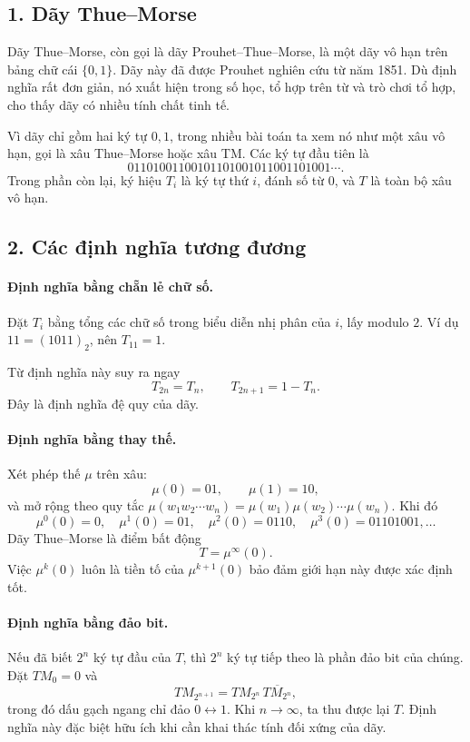 \documentclass[11pt]{article}
\begin{document}
\subsection*{1. Dãy Thue--Morse}

Dãy Thue--Morse, còn gọi là dãy Prouhet--Thue--Morse, là một dãy vô hạn trên
bảng chữ cái \(\{0,1\}\). Dãy này đã được Prouhet nghiên cứu từ năm 1851. Dù
định nghĩa rất đơn giản, nó xuất hiện trong số học, tổ hợp trên từ và trò chơi
tổ hợp, cho thấy dãy có nhiều tính chất tinh tế.

Vì dãy chỉ gồm hai ký tự \(0,1\), trong nhiều bài toán ta xem nó như một xâu vô
hạn, gọi là xâu Thue--Morse hoặc xâu TM. Các ký tự đầu tiên là
\[
  01101001100101101001011001101001\cdots .
\]
Trong phần còn lại, ký hiệu \(T_i\) là ký tự thứ \(i\), đánh số từ \(0\), và
\(T\) là toàn bộ xâu vô hạn.

\subsection*{2. Các định nghĩa tương đương}

\paragraph{Định nghĩa bằng chẵn lẻ chữ số.}
Đặt \(T_i\) bằng tổng các chữ số trong biểu diễn nhị phân của \(i\), lấy modulo
\(2\). Ví dụ \(11=(1011)_2\), nên \(T_{11}=1\).

Từ định nghĩa này suy ra ngay
\[
  T_{2n}=T_n,\qquad T_{2n+1}=1-T_n.
\]
Đây là định nghĩa đệ quy của dãy.

\paragraph{Định nghĩa bằng thay thế.}
Xét phép thế \(\mu\) trên xâu:
\[
  \mu(0)=01,\qquad \mu(1)=10,
\]
và mở rộng theo quy tắc
\(\mu(w_1w_2\cdots w_n)=\mu(w_1)\mu(w_2)\cdots\mu(w_n)\). Khi đó
\[
  \mu^0(0)=0,\quad
  \mu^1(0)=01,\quad
  \mu^2(0)=0110,\quad
  \mu^3(0)=01101001,\ldots
\]
Dãy Thue--Morse là điểm bất động
\[
  T=\mu^\infty(0).
\]
Việc \(\mu^k(0)\) luôn là tiền tố của \(\mu^{k+1}(0)\) bảo đảm giới hạn này
được xác định tốt.

\paragraph{Định nghĩa bằng đảo bit.}
Nếu đã biết \(2^n\) ký tự đầu của \(T\), thì \(2^n\) ký tự tiếp theo là phần
đảo bit của chúng. Đặt \(TM_0=0\) và
\[
  TM_{2^{n+1}}=TM_{2^n}\,\overline{TM_{2^n}},
\]
trong đó dấu gạch ngang chỉ đảo \(0\leftrightarrow1\). Khi \(n\to\infty\), ta
thu được lại \(T\). Định nghĩa này đặc biệt hữu ích khi cần khai thác tính đối
xứng của dãy.
\end{document}
